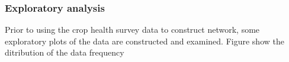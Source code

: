 \subsubsection*{Exploratory analysis}

Prior to using the crop health survey data to construct network, some exploratory plots of the data are constructed and examined. Figure show the ditribution of the data frequency 